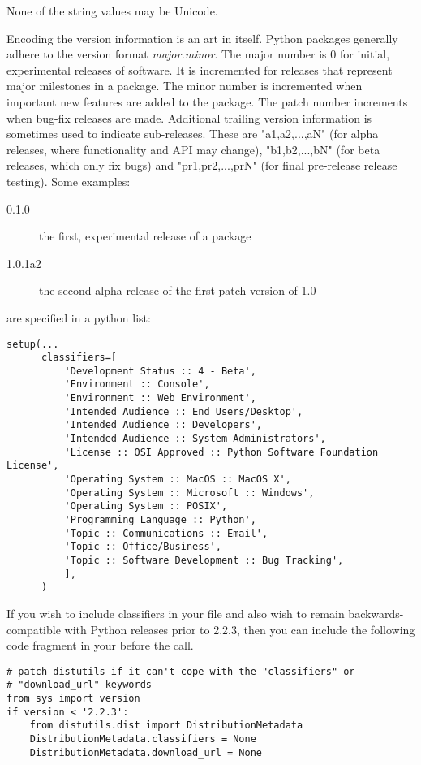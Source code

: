 \documentclass{manual}
\begin{document}
None of the string values may be Unicode.

Encoding the version information is an art in itself. Python packages
generally adhere to the version format
\emph{major.minor}. The major number is
0 for
initial, experimental releases of software. It is incremented for
releases that represent major milestones in a package. The minor
number is incremented when important new features are added to the
package. The patch number increments when bug-fix releases are
made. Additional trailing version information is sometimes used to
indicate sub-releases.  These are "a1,a2,...,aN" (for alpha releases,
where functionality and API may change), "b1,b2,...,bN" (for beta
releases, which only fix bugs) and "pr1,pr2,...,prN" (for final
pre-release release testing). Some examples:

\begin{description}
\item[0.1.0] the first, experimental release of a package
\item[1.0.1a2] the second alpha release of the first patch version of 1.0
\end{description}

 are specified in a python list:

\begin{verbatim}
setup(...
      classifiers=[
          'Development Status :: 4 - Beta',
          'Environment :: Console',
          'Environment :: Web Environment',
          'Intended Audience :: End Users/Desktop',
          'Intended Audience :: Developers',
          'Intended Audience :: System Administrators',
          'License :: OSI Approved :: Python Software Foundation License',
          'Operating System :: MacOS :: MacOS X',
          'Operating System :: Microsoft :: Windows',
          'Operating System :: POSIX',
          'Programming Language :: Python',
          'Topic :: Communications :: Email',
          'Topic :: Office/Business',
          'Topic :: Software Development :: Bug Tracking',
          ],
      )
\end{verbatim}

If you wish to include classifiers in your  file and also
wish to remain backwards-compatible with Python releases prior to 2.2.3,
then you can include the following code fragment in your 
before the  call.

\begin{verbatim}
# patch distutils if it can't cope with the "classifiers" or
# "download_url" keywords
from sys import version
if version < '2.2.3':
    from distutils.dist import DistributionMetadata
    DistributionMetadata.classifiers = None
    DistributionMetadata.download_url = None
\end{verbatim}
\end{document}
